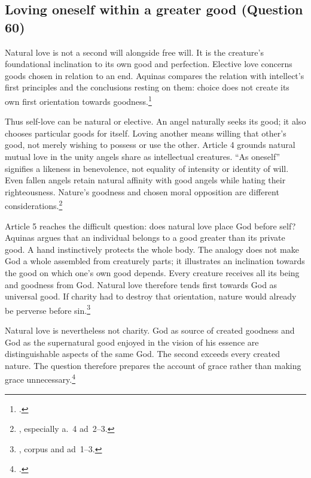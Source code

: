 \subsection{Loving oneself within a greater good (Question 60)}

Natural love is not a second will alongside free will. It is the creature's foundational inclination to its own good and perfection. Elective love concerns goods chosen in relation to an end. Aquinas compares the relation with intellect's first principles and the conclusions resting on them: choice does not create its own first orientation towards goodness.\footnote{.}

Thus self-love can be natural or elective. An angel naturally seeks its good; it also chooses particular goods for itself. Loving another means willing that other's good, not merely wishing to possess or use the other. Article 4 grounds natural mutual love in the unity angels share as intellectual creatures. ``As oneself'' signifies a likeness in benevolence, not equality of intensity or identity of will. Even fallen angels retain natural affinity with good angels while hating their righteousness. Nature's goodness and chosen moral opposition are different considerations.\footnote{, especially a.~4 ad~2--3.}

Article 5 reaches the difficult question: does natural love place God before self? Aquinas argues that an individual belongs to a good greater than its private good. A hand instinctively protects the whole body. The analogy does not make God a whole assembled from creaturely parts; it illustrates an inclination towards the good on which one's own good depends. Every creature receives all its being and goodness from God. Natural love therefore tends first towards God as universal good. If charity had to destroy that orientation, nature would already be perverse before sin.\footnote{, corpus and ad~1--3.}

Natural love is nevertheless not charity. God as source of created goodness and God as the supernatural good enjoyed in the vision of his essence are distinguishable aspects of the same God. The second exceeds every created nature. The question therefore prepares the account of grace rather than making grace unnecessary.\footnote{.}


